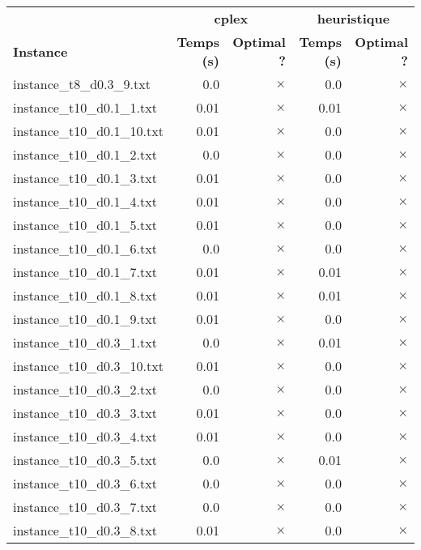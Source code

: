 \documentclass{article}
\begin{document}
\newpage
\begin{center}
\renewcommand{\arraystretch}{1.4} 
 \begin{tabular}{lrrrr}
	\hline
 & \multicolumn{2}{c}{\textbf{cplex}} & \multicolumn{2}{c}{\textbf{heuristique}}\\
\textbf{Instance}  & \textbf{Temps (s)} & \textbf{Optimal ?}  & \textbf{Temps (s)} & \textbf{Optimal ?} \\\hline

instance\_t8\_d0.3\_9.txt & 0.0 & 
$\times$
 & 0.0 & 
$\times$
\\
instance\_t10\_d0.1\_1.txt & 0.01 & 
$\times$
 & 0.01 & 
$\times$
\\
instance\_t10\_d0.1\_10.txt & 0.01 & 
$\times$
 & 0.0 & 
$\times$
\\
instance\_t10\_d0.1\_2.txt & 0.0 & 
$\times$
 & 0.0 & 
$\times$
\\
instance\_t10\_d0.1\_3.txt & 0.01 & 
$\times$
 & 0.0 & 
$\times$
\\
instance\_t10\_d0.1\_4.txt & 0.01 & 
$\times$
 & 0.0 & 
$\times$
\\
instance\_t10\_d0.1\_5.txt & 0.01 & 
$\times$
 & 0.0 & 
$\times$
\\
instance\_t10\_d0.1\_6.txt & 0.0 & 
$\times$
 & 0.0 & 
$\times$
\\
instance\_t10\_d0.1\_7.txt & 0.01 & 
$\times$
 & 0.01 & 
$\times$
\\
instance\_t10\_d0.1\_8.txt & 0.01 & 
$\times$
 & 0.01 & 
$\times$
\\
instance\_t10\_d0.1\_9.txt & 0.01 & 
$\times$
 & 0.0 & 
$\times$
\\
instance\_t10\_d0.3\_1.txt & 0.0 & 
$\times$
 & 0.01 & 
$\times$
\\
instance\_t10\_d0.3\_10.txt & 0.01 & 
$\times$
 & 0.0 & 
$\times$
\\
instance\_t10\_d0.3\_2.txt & 0.0 & 
$\times$
 & 0.0 & 
$\times$
\\
instance\_t10\_d0.3\_3.txt & 0.01 & 
$\times$
 & 0.0 & 
$\times$
\\
instance\_t10\_d0.3\_4.txt & 0.01 & 
$\times$
 & 0.0 & 
$\times$
\\
instance\_t10\_d0.3\_5.txt & 0.0 & 
$\times$
 & 0.01 & 
$\times$
\\
instance\_t10\_d0.3\_6.txt & 0.0 & 
$\times$
 & 0.0 & 
$\times$
\\
instance\_t10\_d0.3\_7.txt & 0.0 & 
$\times$
 & 0.0 & 
$\times$
\\
instance\_t10\_d0.3\_8.txt & 0.01 & 
$\times$
 & 0.0 & 
$\times$

\end{tabular}
\end{center}
\end{document}
